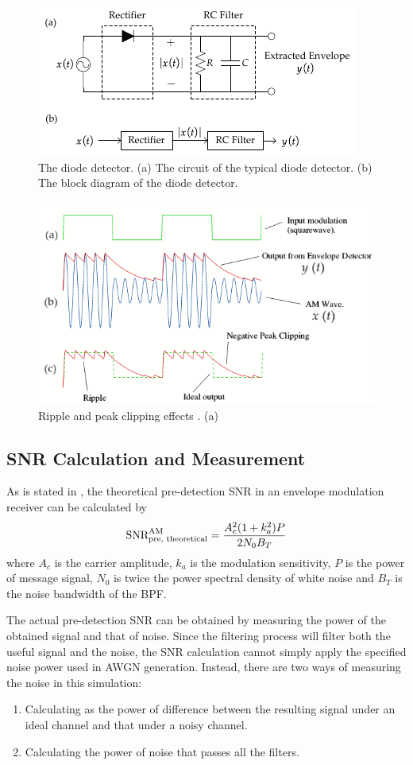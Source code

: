 \documentclass[../ECE459FinalProjectReport.tex]{subfiles}
\begin{document}
\begin{figure}[tb]
    \centering
    \includegraphics[scale=1.8]{plots/diode_detector.pdf}
    \caption{The diode detector. (a) The circuit of the typical diode detector. (b) The block diagram of the diode detector.}
    \label{fig:envelope}
\end{figure}
\begin{figure}[tb]
    \centering
    \includegraphics[width=0.7\linewidth]{plots/envelope_ripple.png}
    \caption{Ripple and peak clipping effects \cite[Fig. 9.3]{lesurfEnvelopeDetector}. (a)}
    \label{fig:rc-ripple}
\end{figure}

\subsection{SNR Calculation and Measurement}
As is stated in \textcite[Eq. (9.26)]{haykinIntroductionAnalogDigital2007}, the theoretical pre-detection SNR in an envelope modulation receiver can be calculated by
\begin{equation}
    \text{SNR}_{\text{pre, theoretical}}^{\text{AM}} = \frac{A_c^2 (1+k_a^2)P}{2N_0 B_T}
\end{equation}
where $A_c$ is the carrier amplitude, $k_a$ is the modulation sensitivity, $P$ is the power of message signal, $N_0$ is twice the power spectral density of white noise and $B_T$ is the noise bandwidth of the BPF.

The actual pre-detection SNR can be obtained by measuring the power of the obtained signal and that of noise. Since the filtering process will filter both the useful signal and the noise, the SNR calculation cannot simply apply the specified noise power used in AWGN generation. Instead, there are two ways of measuring the noise in this simulation:
\begin{enumerate}
    \item Calculating as the power of difference between the resulting signal under an ideal channel and that under a noisy channel.
    \item Calculating the power of noise that passes all the filters.
\end{enumerate}
\end{document}
